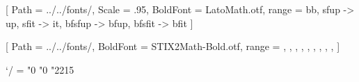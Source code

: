 [
    Path            = ../../fonts/,
    Scale           = .95,
    BoldFont        = LatoMath.otf,
    range           = {bb, sfup -> up, sfit -> it, bfsfup -> bfup, bfsfit -> bfit}
]

[
    Path            = ../../fonts/,
    BoldFont        = STIX2Math-Bold.otf,
    range           = {\int, \sum, \prod, \coprod, \bigoplus, \bigotimes, \bigcup, \bigcap, \bigvee, \bigwedge}
]

\Umathcode`/  =  "0 "0 "2215    %

\usepackage{fancyhdr}
\fancyhf{}
\fancyhead[LE,RO]{\textbf{\textsf{\thepage}}}
\headsep=8mm
\headheight=6mm


\AtBeginDocument{
    \hfuzz=2pt
    \emergencystretch 2em
    \setlength{\belowdisplayshortskip}{\belowdisplayskip}
}

\usepackage{tikz}

\renewcommand{\titlepage}[2]{%
    \clearpage%
    \thispagestyle{empty}%
    \vspace*{20mm}%
    \centerline{\begin{tikzpicture}
        \node [scale = 3] at (0, 0) {\sffamily 荷\hspace{.5em}思};
        \node [scale = 1.8] at (0, -94.5mm) {\sffamily #1};
        \node [scale = 1.2] at (0, -105mm) {\sffamily 第 #2 期};
        \draw (-16mm, -8mm) -- (16mm, -8mm);
        \draw (-14mm, -100mm) -- (14mm, -100mm);
        \draw (-8mm, -110mm) -- (8mm, -110mm);
    \end{tikzpicture}}%
    \clearpage%
}

\newcommand{\committee}{%
    \clearpage%
    \thispagestyle{empty}%
    \vspace*{120mm}%
}

\newcommand{\committeeitem}[2]{%
    \par%
    {%
        \leftskip=3em%
        \rightskip=8em%
        \parindent=-3em%
        {\bfseries\sffamily#1}\quad%
        {\sffamily#2}%
        \par\vspace{6pt}%
    }%
}

\newcommand{\toctitle}{%
    \clearpage%
    \thispagestyle{empty}%
    \vspace*{15mm}%
    \noindent{\huge\sffamily 目录}%
    \par\vspace{10mm}%
}

